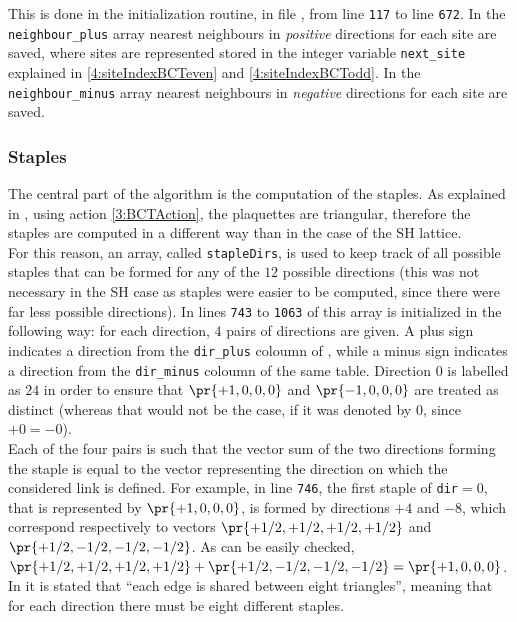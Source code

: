 This is done in the initialization routine, in file , from line \texttt{117} to line \texttt{672}.
In the \texttt{neighbour\_plus} array nearest neighbours in \emph{positive} directions for each site are saved, where sites are represented stored in the integer variable \texttt{next\_site} explained in \eqref{4:siteIndexBCTeven} and \eqref{4:siteIndexBCTodd}.
In the \texttt{neighbour\_minus} array nearest neighbours in \emph{negative} directions for each site are saved.

\subsubsection{Staples}
The central part of the algorithm is the computation of the staples.
As explained in , using action \eqref{3:BCTAction}, the plaquettes are triangular, therefore the staples are computed in a different way than in the case of the SH lattice.\\
For this reason, an array, called \texttt{stapleDirs}, is used to keep track of all possible staples that can be formed for any of the $12$ possible directions (this was not necessary in the SH case as staples were easier to be computed, since there were far less possible directions).
In lines \texttt{743} to \texttt{1063} of  this array is initialized in the following way: for each direction, $4$ pairs of directions are given.
A plus sign indicates a direction from the \texttt{dir\_plus} coloumn of , while a minus sign indicates a direction from the \texttt{dir\_minus} coloumn of the same table.
Direction $0$ is labelled as $24$ in order to ensure that $\pr{+1,0,0,0}$ and $\pr{-1,0,0,0}$ are treated as distinct (whereas that would not be the case, if it was denoted by $0$, since $+0=-0$).\\
Each of the four pairs is such that the vector sum of the two directions forming the staple is equal to the vector representing the direction on which the considered link is defined.
For example, in line \texttt{746}, the first staple of \texttt{dir}$=0$, that is represented by $\pr{+1,0,0,0}$, is formed by directions $+4$ and $-8$, which correspond respectively to vectors $\pr{+1/2,+1/2,+1/2,+1/2}$ and $\pr{+1/2,-1/2,-1/2,-1/2}$.
As can be easily checked, $\pr{+1/2,+1/2,+1/2,+1/2}+\pr{+1/2,-1/2,-1/2,-1/2}=\pr{+1,0,0,0}$.\\
In  it is stated that ``each edge is shared between eight triangles'', meaning that for each direction there must be eight different staples.
